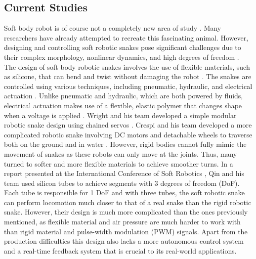 \documentclass[twoside, 11pt]{article}
\begin{document}
\subsection{Current Studies}
Soft body robot is of course not a completely new area of study \cite{cycc21}\cite{klt13}\cite{m18}. Many researchers have already attempted to recreate this fascinating animal. However, designing and controlling soft robotic snakes pose significant challenges due to their complex morphology, nonlinear dynamics, and high degrees of freedom \cite{Paap2000ARS}\cite{Matsuno2003ControlOR}\cite{Hirose2004BiologicallyIS}. The design of soft body robotic snakes involves the use of flexible materials, such as silicone, that can bend and twist without damaging the robot \cite{llcl19}. The snakes are controlled using various techniques, including pneumatic, hydraulic, and electrical actuation \cite{llcl19}\cite{lschw21}\cite{Palmre2014NanothornEF}. Unlike pneumatic and hydraulic, which are both powered by fluids, electrical actuation makes use of a flexible, elastic polymer that changes shape when a voltage is applied \cite{gbzsp20}\cite{doi:10.2514/6.2001-1492}. Wright and his team developed a simple modular robotic snake design using chained servos \cite{Wright2007DesignOA}. Crespi and his team developed a more complicated robotic snake involving DC motors and detachable wheels to traverse both on the ground and in water \cite{Crespi2006AmphiBotIA}. However, rigid bodies cannot fully mimic the movement of snakes as these robots can only move at the joints. Thus, many turned to softer and more flexible materials to achieve smoother turns\cite{Onal2013AutonomousUS}\cite{Skorina2018ReversePA}. In a report presented at the International Conference of Soft Robotics \cite{qwsslo18}, Qin and his team used silicon tubes to achieve segments with 3 degrees of freedom (DoF). Each tube is responsible for 1 DoF and with three tubes, the soft robotic snake can perform locomotion much closer to that of a real snake than the rigid robotic snake. However, their design is much more complicated than the ones previously mentioned, as flexible material and air pressure are much harder to work with than rigid material and pulse-width modulation (PWM) signals. Apart from the production difficulties this design also lacks a more autonomous control system and a real-time feedback system that is crucial to its real-world applications. 
\end{document}
